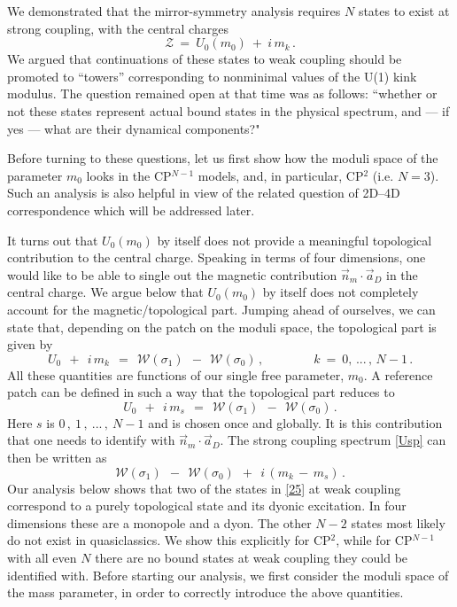 \documentclass[epsfig,12pt]{article}
\def\beq{\begin{equation}}
\def\eeq{\end{equation}}
\def\beq{\begin{equation}}
\def\eeq{\end{equation}}
\newcommand{\mc}[1]{\mathcal{#1}}
\begin{document}
	We demonstrated that the mirror-symmetry analysis requires $ N $ states to exist at strong coupling,
	with  the 
	central charges
\beq
\label{Usp}
	\mc{Z} ~=~ U_0(m_0) ~+~ i\,m_k\,.
\eeq
	We argued that continuations of these states to  weak coupling should be promoted to ``towers''
	corresponding to nonminimal values of the U(1) kink modulus.
	The question remained open at that time was as follows: ``whether or not these states represent
	actual bound states in the physical spectrum, and --- if yes --- what are their dynamical components?"

	Before turning to these questions,  let us first show how the moduli space of the parameter
	$ m_0 $ looks   in the CP$^{N-1}$ models, and, in particular, CP$^2$ (i.e. $N=3$). 
	Such an analysis is also helpful in view of the related question of 2D--4D correspondence
	which will be addressed later.
	
	It turns out that $ U_0(m_0) $ by itself does not  provide a meaningful topological contribution
	to the central charge.
	Speaking in terms of four dimensions, one would like to be able to single out 
	the magnetic contribution $ \vec{n}{}_m \cdot \vec{a}{}_D $ in the central charge.
	We argue below  that $ U_0(m_0) $ by itself does not completely account for the 
	magnetic/topological part.
	Jumping ahead of ourselves, we can state that, depending on the patch on the moduli space, 
	the topological part is given by
\beq
	U_0 ~~+~~ i\, m_k ~~=~~ \mc{W}(\sigma_1) ~~-~~ \mc{W}(\sigma_0) \,,
	\qquad\qquad k ~=~ 0,\,...\,,\, N-1\,.
\eeq
	All these quantities are functions of our single free parameter, $ m_0 $.
	A reference patch can be defined in such a way that the topological part reduces to
\beq
	U_0 ~~+~~ i\, m_s ~~=~~ \mc{W}(\sigma_1) ~~-~~ \mc{W}(\sigma_0) \,.
\eeq
	Here $ s $ is $ 0\,,~1\,,~...\,,~ N-1 $ and is chosen once and globally.
	It is this contribution that one needs to identify with $ \vec{n}{}_m \cdot \vec{a}{}_D $.
	The strong coupling spectrum \eqref{Usp} can then be written as
\beq
	\mc{W}(\sigma_1) ~~-~~ \mc{W}(\sigma_0) ~~+~~ i\, ( m_k \,-\, m_s )\,.
	\label{25}
\eeq
	Our analysis below shows that two of the states in \eqref{25} at weak coupling correspond to 
	a purely topological state and its dyonic excitation.
	In four dimensions these are a monopole and a dyon.
	The other $ N-2 $ states most likely do not exist in quasiclassics.
	We show this explicitly for CP$^2$, while for CP$^{N-1}$ with all even $ N $ 
	there are no bound states at weak coupling they could be identified with.
	Before starting our analysis, we first
	consider the moduli space of the mass parameter, 
	in order to correctly introduce the above quantities.
\end{document}
